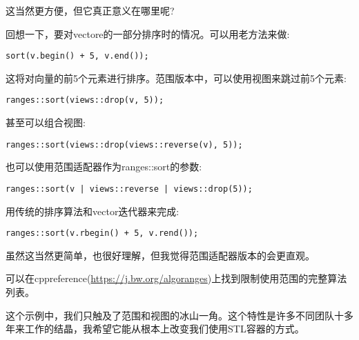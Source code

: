 这当然更方便，但它真正意义在哪里呢?

回想一下，要对vectore的一部分排序时的情况。可以用老方法来做:

\begin{lstlisting}[style=styleCXX]
sort(v.begin() + 5, v.end());
\end{lstlisting}

这将对向量的前5个元素进行排序。范围版本中，可以使用视图来跳过前5个元素:

\begin{lstlisting}[style=styleCXX]
ranges::sort(views::drop(v, 5));
\end{lstlisting}

甚至可以组合视图:

\begin{lstlisting}[style=styleCXX]
ranges::sort(views::drop(views::reverse(v), 5));
\end{lstlisting}

也可以使用范围适配器作为ranges::sort的参数:

\begin{lstlisting}[style=styleCXX]
ranges::sort(v | views::reverse | views::drop(5));
\end{lstlisting}

用传统的排序算法和vector迭代器来完成:

\begin{lstlisting}[style=styleCXX]
ranges::sort(v.rbegin() + 5, v.rend());
\end{lstlisting}

虽然这当然更简单，也很好理解，但我觉得范围适配器版本的会更直观。

可以在cppreference(\url{https://j.bw.org/algoranges})上找到限制使用范围的完整算法列表。

这个示例中，我们只触及了范围和视图的冰山一角。这个特性是许多不同团队十多年来工作的结晶，我希望它能从根本上改变我们使用STL容器的方式。
























